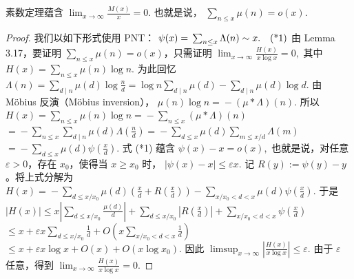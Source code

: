 \begin{theorem}[原文 Theorem 3.18]
	素数定理蕴含
	\(\textstyle \lim_{x\to\allowbreak{}\infty}\frac{M(x)}x=\allowbreak{}0.\)
	也就是说，
	\(\textstyle \sum_{n\leq\allowbreak{} x}\mu(n)=\allowbreak{}o(x).\)
\end{theorem}

\begin{proof}
	我们以如下形式使用 PNT：
	\(\textstyle \psi(x)=\allowbreak{}\sum_{n\leq\allowbreak{} x}\Lambda(n)\sim\allowbreak{} x. \quad\textup{(*1)}\)
	由 Lemma 3.17，要证明 $\sum_{n\leq x}\mu(n)=o(x)$，只需证明
	\(\textstyle \lim_{x\to\allowbreak{}\infty}\frac{H(x)}{x\log x}=\allowbreak{}0,\allowbreak{}\)
	其中
	\(\textstyle H(x)=\allowbreak{}\sum_{n\leq\allowbreak{} x}\mu(n)\log n.\)
	为此回忆
	\(\textstyle \Lambda(n) =\allowbreak{} \sum_{d\mid\allowbreak{} n}\mu(d)\log\frac nd =\allowbreak{} \log n\sum_{d\mid\allowbreak{} n}\mu(d) - \sum_{d\mid\allowbreak{} n}\mu(d)\log d.\)
	由 Möbius 反演（Möbius inversion），
	\(\textstyle \mu(n)\log n=\allowbreak{}-(\mu*\Lambda)(n).\)
	所以
	\(\textstyle H(x) =\allowbreak{} \sum_{n\leq\allowbreak{} x}\mu(n)\log n =\allowbreak{} -\sum_{n\leq\allowbreak{} x}(\mu*\Lambda)(n)\) \(\textstyle =\allowbreak{} -\sum_{n\leq\allowbreak{} x}\sum_{d\mid\allowbreak{} n}\mu(d)\Lambda\left(\frac nd\right) =\allowbreak{} -\sum_{d\leq\allowbreak{} x}\mu(d)\sum_{m\leq\allowbreak{} x/d}\Lambda(m)\) \(\textstyle =\allowbreak{} -\sum_{d\leq\allowbreak{} x}\mu(d)\psi\left(\frac xd\right).\)
	式 (*1) 蕴含
	\(\textstyle \psi(x)-x=\allowbreak{}o(x),\allowbreak{}\)
	也就是说，对任意 $\varepsilon>0$，存在 $x_0$，使得当 $x\geq x_0$ 时，
	\(\textstyle |\psi(x)-x|\leq\allowbreak{} \varepsilon x.\)
	记 $R(y):=\psi(y)-y$。将上式分解为
	\(\textstyle H(x) =\allowbreak{} -\sum_{d\leq\allowbreak{} x/x_0}\mu(d)\left(\frac xd+\allowbreak{}R\left(\frac xd\right)\right) -\sum_{x/x_0<d<x}\mu(d)\psi\left(\frac xd\right).\)
	于是
	\(\textstyle |H(x)| \leq\allowbreak{} x\left|\sum_{d\leq\allowbreak{} x/x_0}\frac{\mu(d)}d\right| +\allowbreak{} \sum_{d\leq\allowbreak{} x/x_0}\left|R\left(\frac xd\right)\right| +\allowbreak{} \sum_{x/x_0<d<x}\psi\left(\frac xd\right)\) \(\textstyle \leq\allowbreak{} x+\allowbreak{}\varepsilon x\sum_{d\leq\allowbreak{} x/x_0}\frac1d +\allowbreak{} O\left(x\sum_{x/x_0<d<x}\frac1d\right)\) \(\textstyle \leq\allowbreak{} x+\allowbreak{}\varepsilon x\log x+\allowbreak{}O(x)+\allowbreak{}O(x\log x_0).\)
	因此
	\(\textstyle \limsup_{x\to\allowbreak{}\infty} \left|\frac{H(x)}{x\log x}\right| \leq\allowbreak{} \varepsilon.\)
	由于 $\varepsilon$ 任意，得到
	\(\textstyle \lim_{x\to\allowbreak{}\infty}\frac{H(x)}{x\log x}=\allowbreak{}0.\)
\end{proof}


